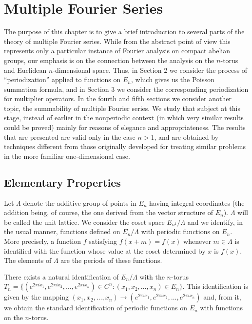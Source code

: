 \chapter{Multiple Fourier Series}
\label{ch:c7}

The purpose of this chapter is to give a brief introduction to several parts of the theory of multiple Fourier series. While from the abstract point of view this represents only a particular instance of Fourier analysis on compact abelian groups, our emphasis is on the connection between the analysis on the $n$-torus and Euclidean $n$-dimensional space. Thus, in Section 2 we consider the process of ``periodization'' applied to functions on $E_n$, which gives us the Poisson summation formula, and in Section 3 we consider the corresponding periodization for multiplier operators. In the fourth and fifth sections we consider another topic, the summability of multiple Fourier series. We study that subject at this stage, instead of earlier in the nonperiodic context (in which very similar results could be proved) mainly for reasons of elegance and appropriateness. The results that are presented are valid only in the case $n > 1$, and are obtained by techniques different from those originally developed for treating similar problems in the more familiar one-dimensional case.

\section{Elementary Properties}

Let $\Lambda$ denote the additive group of points in $E_n$ having integral coordinates (the addition being, of course, the one derived from the vector structure of $E_n$). $\Lambda$ will be called the unit lattice. We consider the coset space $E_{n^1}/\Lambda$ and we identify, in the usual manner, functions defined on $E_n/\Lambda$ with periodic functions on $E_n$. More precisely, a function $f$ satisfying $f(x + m) = f(x)$ whenever $m \in \Lambda$ is identified with the function whose value at the coset determined by $x$ is $f(x)$. The elements of $\Lambda$ are the periods of these functions.

There exists a natural identification of $E_n/\Lambda$ with the $n$-torus $T_n = \{(e^{2\pi i x_1}, e^{2\pi i x_2}, \ldots, e^{2\pi i x_n}) \in C^n: (x_1, x_2, \ldots, x_n) \in E_n\}$. This identification is given by the mapping $(x_1, x_2, \ldots, x_n) \to (e^{2\pi i x_1}, e^{2\pi i x_2}, \ldots, e^{2\pi i x_n})$ and, from it, we obtain the standard identification of periodic functions on $E_n$ with functions on the $n$-torus.

